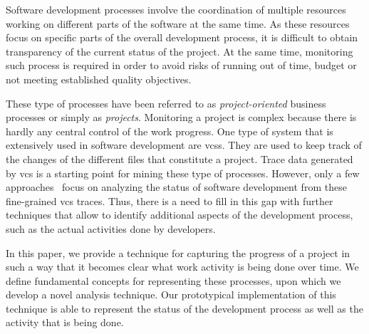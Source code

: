 
Software development processes involve the coordination of multiple resources working on different parts of the software at the same time. As these resources focus on specific parts of the overall development process, it is difficult to obtain  transparency of the current status of the project. At the same time, monitoring such process is required in order to avoid risks of running out of time, budget or not meeting established quality objectives.

These type of processes have been referred to as \emph{project-oriented} business processes or simply as \emph{projects}. Monitoring a project is complex because there is hardly any central control of the work progress. 
One type of system that is extensively used in software development are \glspl{vcs}.
They are used to keep track of the changes of the different files that constitute a project. Trace data generated by \gls{vcs} is a starting point for mining these type of processes. However, only a few approaches~\citep{DBLP:conf/bpm/BalaCMRP,DBLP:conf/bpm/JookenCJ19}  focus on analyzing the status of software development from these fine-grained \gls{vcs} traces. Thus, there is a need to fill in this gap with further techniques that allow to identify additional aspects of the development process, such as the actual activities done by developers. 


In this paper, we provide a technique for capturing the progress of a project in such a way that it becomes clear what work activity is being done over time. We define fundamental concepts for representing these processes, upon which we develop a novel analysis technique. Our prototypical implementation of this technique is able to represent the status of the development process as well as the activity that is being done. 

